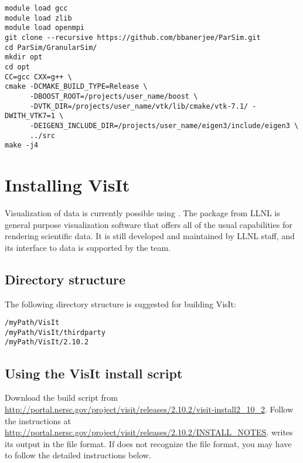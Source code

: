 \documentclass[11pt,fleqn]{book} %
\begin{document}
\begin{lstlisting}[backgroundcolor=\color{background}]
module load gcc
module load zlib
module load openmpi
git clone --recursive https://github.com/bbanerjee/ParSim.git
cd ParSim/GranularSim/
mkdir opt
cd opt
CC=gcc CXX=g++ \
cmake -DCMAKE_BUILD_TYPE=Release \
      -DBOOST_ROOT=/projects/user_name/boost \
      -DVTK_DIR=/projects/user_name/vtk/lib/cmake/vtk-7.1/ -DWITH_VTK7=1 \
      -DEIGEN3_INCLUDE_DIR=/projects/user_name/eigen3/include/eigen3 \
      ../src
make -j4
\end{lstlisting}

\chapter{Installing VisIt}
Visualization of \GranularSim data is currently possible using
\Visit. The \Visit package from LLNL is general purpose
visualization software that offers all of the usual capabilities for
rendering scientific data.  It is still developed and maintained by
LLNL staff, and its interface to \GranularSim data is supported by
the \VTK team. 

\section{Directory structure}
The following directory structure is suggested for building VisIt:

\begin{lstlisting}[backgroundcolor=\color{background}]
/myPath/VisIt
/myPath/VisIt/thirdparty
/myPath/VisIt/2.10.2
\end{lstlisting}

\section{Using the VisIt install script}
Download the build script from \\
\url{http://portal.nersc.gov/project/visit/releases/2.10.2/visit-install2_10_2}.
Follow the instructions at \url{http://portal.nersc.gov/project/visit/releases/2.10.2/INSTALL_NOTES}.
\GranularSim writes its output in the \VTK file format.  If \Visit does not recognize the
\VTK file format, you may have to follow the detailed instructions below.
\end{document}
